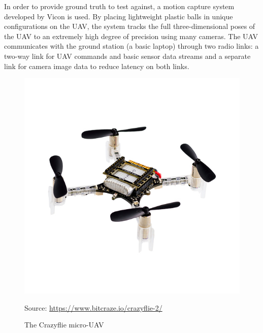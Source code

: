 \documentclass[12pt]{article}
\begin{document}
In order to provide ground truth to test against, a motion capture system developed by Vicon is used. By placing lightweight plastic balls in unique configurations on the UAV, the system tracks the full three-dimensional poses of the UAV to an extremely high degree of precision using many cameras. The UAV communicates with the ground station (a basic laptop) through two radio links: a two-way link for UAV commands and basic sensor data streams and a separate link for camera image data to reduce latency on both links.

\begin{figure}
	\centering
	\includegraphics[scale=1.0]{crazyflie_new}
	\caption[The Crazyflie micro-UAV]{The Crazyflie micro-UAV}
	\vspace{8pt}
	\small Source: \url{https://www.bitcraze.io/crazyflie-2/}
	\label{crazyflie_image}
\end{figure}
\end{document}
